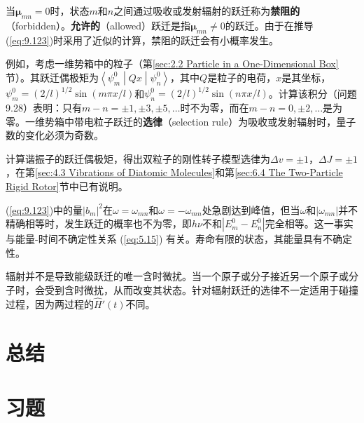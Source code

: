     当$\symbf{\mu}_{mn} = 0$时，状态$m$和$n$之间通过吸收或发射辐射的跃迁称为\textbf{禁阻的}（forbidden）。\textbf{允许的}（allowed）跃迁是指$\symbf{\mu}_{mn} \neq 0$的跃迁。由于在推导(\ref{eq:9.123})时采用了近似的计算，禁阻的跃迁会有小概率发生。

    例如，考虑一维势箱中的粒子（第\ref{sec:2.2 Particle in a One-Dimensional Box}节）。其跃迁偶极矩为$\left\langle \psi_m^0 \middle| Qx \middle| \psi_n^0 \right\rangle$，其中$Q$是粒子的电荷，$x$是其坐标，$\psi_m^0 = \left(2/l\right)^{1/2}\sin\left(m\pi x/l\right)$和$\psi_n^0 = \left(2/l\right)^{1/2}\sin\left(n\pi x/l\right)$。计算该积分（问题9.28）表明：只有$m - n = \pm 1, \pm 3, \pm 5, \ldots$时不为零，而在$m - n = 0, \pm 2,\ldots$是为零。一维势箱中带电粒子跃迁的\textbf{选律}（selection rule）为吸收或发射辐射时，量子数的变化必须为奇数。

    计算谐振子的跃迁偶极矩，得出双粒子的刚性转子模型选律为$\Delta v = \pm 1$，$\Delta J = \pm 1$，在第\ref{sec:4.3 Vibrations of Diatomic Molecules}和第\ref{sec:6.4 The Two-Particle Rigid Rotor}节中已有说明。

    (\ref{eq:9.123})中的量$\left|b_m\right|^2$在$\omega = \omega_{mn}$和$\omega = -\omega_{mn}$处急剧达到峰值，但当$\omega$和$\left| \omega_{mn} \right|$并不精确相等时，发生跃迁的概率也不为零，即$h\nu$不和$\left|E_m^0 - E_n^0\right|$完全相等。这一事实与能量-时间不确定性关系 (\ref{eq:5.15}) 有关。寿命有限的状态，其能量具有不确定性。

    辐射并不是导致能级跃迁的唯一含时微扰。当一个原子或分子接近另一个原子或分子时，会受到含时微扰，从而改变其状态。针对辐射跃迁的选律不一定适用于碰撞过程，因为两过程的$\hat{H}'\left(t\right)$不同。



\section*{总结}

\section*{习题}